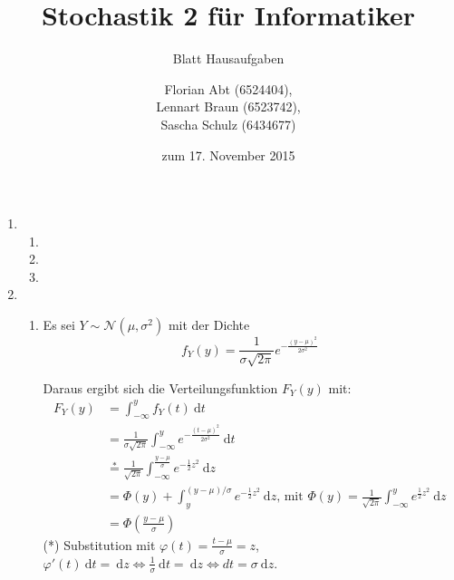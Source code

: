 \documentclass[a4paper]{scrartcl}
\title{Stochastik 2 für Informatiker}
\subtitle{Blatt {\blattnr} Hausaufgaben}
\author{
    Florian Abt (6524404), \\
    Lennart Braun (6523742), \\
    Sascha Schulz (6434677)
}
\date{zum 17. November 2015}
\newcommand{\dif}{\ \mathrm{d}}
\def \blattnr {5}
\begin{document}
\maketitle

\begin{enumerate}[label=\bfseries \blattnr.\arabic*]
    \item
        \begin{enumerate}
            \item

            \item

            \item

        \end{enumerate}
   
    \item
        \begin{enumerate}
            \item
	      Es sei $Y \sim \mathcal{N}(\mu, \sigma^2)$ mit der Dichte
	      \begin{equation*}
		  f_Y(y) = \frac1{\sigma\sqrt{2\pi}} e^{-\frac{(y-\mu)^2}{2\sigma^2}}
	      \end{equation*}
	      
	      Daraus ergibt sich die Verteilungsfunktion $F_Y(y)$ mit:
	      \begin{equation*}
		\begin{split}
		  F_Y(y) 
		  &= \int_{-\infty}^y f_Y(t) \dif t \\ 
		  &= \frac1{\sigma\sqrt{2\pi}} \int_ {-\infty}^y e^{-\frac{(t-\mu)^2}{2\sigma^2}} \dif t\\
		  &\stackrel{*}{=} \frac1{\sqrt{2\pi}} \int_{-\infty}^{\frac{y-\mu}\sigma} e^{-\frac12z^2} \dif z \\
		  &= \Phi(y) + \int_y^{(y-\mu)/\sigma} e^{-\frac12z^2} \dif z \text{, mit } \Phi(y) = \frac1{\sqrt{2\pi}} \int_{-\infty}^y e^{\frac12z^2} \dif z \\
		  & =\Phi\left(\frac{y-\mu}\sigma\right)
		 \end{split}
	      \end{equation*}
	      (*) Substitution mit $\varphi(t) = \frac{t-\mu}{\sigma} = z$, \\
	      $\varphi'(t) \dif t = \dif z \Leftrightarrow \frac1\sigma \dif t = \dif z \Leftrightarrow dt = \sigma \dif z$.
	      

\end{enumerate}
\end{enumerate}
\end{document}
